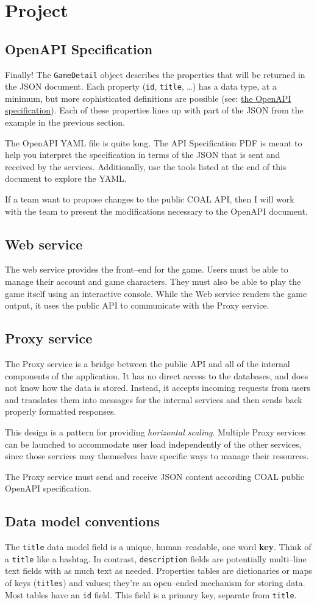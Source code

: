 \documentclass{article}
\newcommand{\enterProblemHeader}[1]{
}
\newcommand{\exitProblemHeader}[1]{
\nobreak\extramarks{#1}{}\nobreak
}
\newcounter{homeworkProblemCounter} %
\newcommand{\homeworkProblemName}{}
\newenvironment{homeworkProblem}[1][Problem \arabic{homeworkProblemCounter}]{ %
\stepcounter{homeworkProblemCounter} %
\renewcommand{\homeworkProblemName}{#1} %
\section{\homeworkProblemName} %
\enterProblemHeader{\homeworkProblemName} %
}{
\exitProblemHeader{\homeworkProblemName} %
}
\newcommand{\homeworkSectionName}{}
\newenvironment{homeworkSection}[1]{ %
\renewcommand{\homeworkSectionName}{#1} %
\subsection{\homeworkSectionName} %
\enterProblemHeader{\homeworkProblemName\ [\homeworkSectionName]} %
}{
\enterProblemHeader{\homeworkProblemName} %
}
\begin{document}
\begin{homeworkProblem}[Project]
\begin{homeworkSection}{OpenAPI Specification}
Finally! The \texttt{GameDetail} object describes the properties that will be returned in the JSON document. Each property (\texttt{id}, \texttt{title}, \dots) has a data type, at a minimum, but more sophisticated definitions are possible (see: \href{https://swagger.io/specification/}{the OpenAPI specification}). Each of these properties lines up with part of the JSON from the example in the previous section.

The OpenAPI YAML file is quite long. The API Specification PDF is meant to help you interpret the specification in terms of the JSON that is sent and received by the services. Additionally, use the tools listed at the end of this document to explore the YAML.

If a team want to propose changes to the public COAL API, then I will work with the team to present the modifications necessary to the OpenAPI document.

\end{homeworkSection}



\begin{homeworkSection}{Web service}
	The web service provides the front--end for the game. Users must be able to manage their account and game characters. They must also be able to play the game itself using an interactive console. While the Web service renders the game output, it uses the public API to communicate with the Proxy service.
\end{homeworkSection}


\begin{homeworkSection}{Proxy service}
	The Proxy service is a bridge between the public API and all of the internal components of the application. It has no direct access to the databases, and does not know how the data is stored. Instead, it accepts incoming requests from users and translates them into messages for the internal services and then sends back properly formatted responses.
	
	This design is a pattern for providing \textit{horizontal scaling}. Multiple Proxy services can be launched to accommodate user load independently of the other services, since those services may themselves have specific ways to manage their resources.

	The Proxy service must send and receive JSON content according COAL public OpenAPI specification.
\end{homeworkSection}

\begin{homeworkSection}{Data model conventions}
	The \texttt{title} data model field is a unique, human--readable, one word \textbf{key}. Think of a \texttt{title} like a hashtag. In contrast, \texttt{description} fields are potentially multi--line text fields with as much text as needed. Properties tables are dictionaries or maps of keys (\texttt{titles}) and values; they're an open--ended mechanism for storing data. Most tables have an \texttt{id} field. This field is a primary key, separate from \texttt{title}.
\end{homeworkSection}


\end{homeworkProblem}
\end{document}
